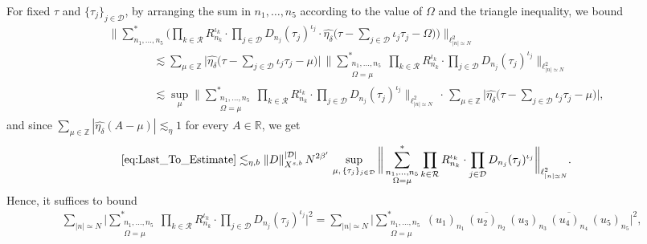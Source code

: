 \documentclass[11pt, xcolor = dvipsnames,reqno
]{amsart}
\theoremstyle{definition}
\theoremstyle{remark}
\begin{document}
For fixed $\tau$ and $\{\tau_j\}_{j \in \mathcal D}$, 
by arranging the sum in $n_1, \ldots, n_5$ according to the value of $\Omega$ and the triangle inequality,  we bound
\begin{align}
    & \bigg\lVert \sum_{n_1, \ldots, n_5}^*
    \Big(
    \prod_{k \in \mathcal R} R_{n_k}^{\iota_k} \cdot 
    \prod_{j \in \mathcal D}  D_{n_j}(\tau_j)^{\iota_j} \cdot
    \widehat{\eta_\delta}
    \big(
    \tau - \sum_{j \in \mathcal D} \iota_j \tau_j  - \Omega
    \big)
    \Big) 
    \bigg\rVert_{\ell^2_{|n|\simeq N}} \\
    & \qquad \qquad \lesssim 
    \sum_{\mu \in \mathbb Z} \Big|\widehat{\eta_\delta}
    \big(
    \tau - \sum_{j \in \mathcal D} \iota_j \tau_j  - \mu \big) \Big| \, 
    \bigg\lVert \sum_{ \substack{n_1, \ldots, n_5 \\ \Omega = \mu}}^*
    \prod_{k \in \mathcal R} R_{n_k}^{\iota_k} \cdot 
    \prod_{j \in \mathcal D}  D_{n_j}(\tau_j)^{\iota_j} 
    \bigg\rVert_{\ell^2_{|n|\simeq N}} \\
    & \qquad \qquad \lesssim 
    \sup_{\mu}
    \bigg\lVert \sum_{ \substack{n_1, \ldots, n_5 \\ \Omega = \mu}}^*
    \prod_{k \in \mathcal R} R_{n_k}^{\iota_k} \cdot 
    \prod_{j \in \mathcal D}  D_{n_j}(\tau_j)^{\iota_j} 
    \bigg\rVert_{\ell^2_{|n|\simeq N}} \, \cdot \, 
    \sum_{\mu \in \mathbb Z} \Big| \widehat{\eta_\delta}
    \big(
    \tau - \sum_{j \in \mathcal D} \iota_j \tau_j  - \mu \big) \Big|, 
\end{align}
and since $\sum_{\mu \in \mathbb Z} |\widehat{\eta_\delta} (A - \mu) |\lesssim_\eta 1$ for every $A \in \mathbb R$, we get
\begin{align}\label{eq:To_Bound_Pre}
    \eqref{eq:Last_To_Estimate}
    & \lesssim_{\eta,b}  \|D\|_{X^{s,b}}^{|\mathcal{D}|} \, 
    N^{2\beta'} \, 
    \sup_{\mu, \,  \{\tau_j \}_{j \in \mathcal D}} 
    \bigg\lVert \sum_{ \substack{n_1, \ldots, n_5 \\ \Omega = \mu}}^*
    \prod_{k \in \mathcal R} R_{n_k}^{\iota_k} \cdot 
    \prod_{j \in \mathcal D}  D_{n_j}(\tau_j)^{\iota_j} 
    \bigg\rVert_{\ell^2_{|n|\simeq N}}.
    \end{align}
Hence, it suffices to bound
\begin{align}\label{eq:To_Bound}
    \sum_{|n| \simeq N}
    \bigg|
    \sum_{ \substack{n_1, \ldots, n_5 \\ \Omega = \mu}}^*
    \prod_{k \in \mathcal R} R_{n_k}^{\iota_k} \cdot 
    \prod_{j \in \mathcal D}  D_{n_j}(\tau_j)^{\iota_j}
    \bigg|^2 
    = 
    \sum_{|n| \simeq N}
    \Big|
    \sum_{\substack{n_1, \ldots, n_5 \\ \Omega= \mu}}^*
    (u_1)_{n_1} \, \overline{(u_2)_{n_2}} \, (u_3)_{n_3} \, \overline{(u_4)_{n_4}} \, (u_5)_{n_5} 
    \bigg|^2,
\end{align}
\end{document}
